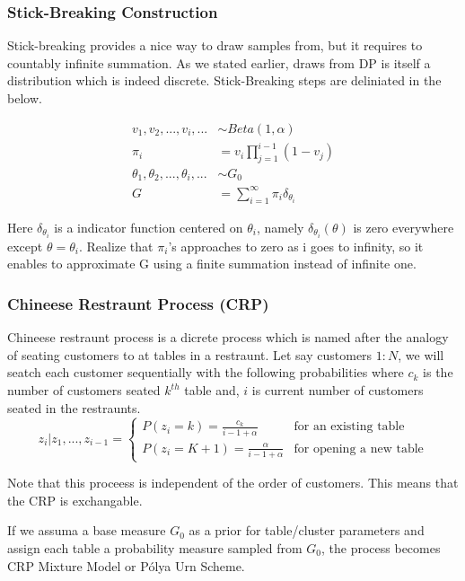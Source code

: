 \documentclass[a4paper]{article}
\begin{document}
\subsubsection{Stick-Breaking Construction}

Stick-breaking provides a nice way to draw samples from, but it requires
to countably infinite summation. As we stated earlier, draws from DP is
itself a distribution which is indeed discrete. Stick-Breaking steps are
deliniated in the below.

\begin{align*}
v_1,v_2,...,v_i,... & \sim Beta(1,\alpha) \\
\pi_i &= v_i \prod_{j=1}^{i-1}(1-v_j) \\ 
\theta_1,\theta_2,...,\theta_i,... & \sim G_0 \\
G & = \sum_{i=1}^{\infty}\pi_i\delta_{\theta_i}
\end{align*}

Here \(\delta_{\theta_i}\) is a indicator function centered on
\(\theta_i\), namely \(\delta_{\theta_i}(\theta)\) is zero everywhere
except \(\theta=\theta_i\). Realize that \(\pi_i\)'s approaches to zero
as i goes to infinity, so it enables to approximate G using a finite
summation instead of infinite one.


\subsubsection{Chineese Restraunt Process (CRP)}

Chineese restraunt process is a dicrete process which is named after the
analogy of seating customers to at tables in a restraunt. Let say
customers \(1:N\), we will seatch each customer sequentially with the
following probabilities where \(c_k\) is the number of customers seated
\(k^{th}\) table and, \(i\) is current number of customers seated in the
restraunts.
\begin{equation*}
z_i|z_1,...,z_{i-1} = \begin{cases}
P(z_i=k)=\frac{c_k}{i-1+\alpha} & \text{for an existing table} \\
P(z_i=K+1)=\frac{\alpha}{i-1+\alpha} & \text{for opening a new table}
\end{cases}
\end{equation*}

Note that this proceess is independent of the order of customers. This
means that the CRP is exchangable\cite{fang2016dirichlet}.

If we assuma a base measure \(G_0\) as a prior for table/cluster
parameters and assign each table a probability measure sampled from
\(G_0\), the process becomes CRP Mixture Model or Pólya Urn Scheme.
\end{document}
